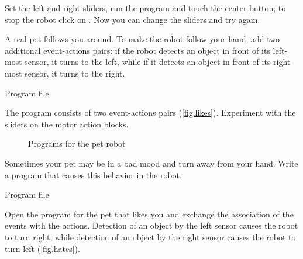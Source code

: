 Set the left and right sliders, run the program and touch the center
button; to stop the robot click on . Now you can change the
sliders and try again.



A real pet follows you around. To make the robot follow your hand, add
two additional event-actions pairs: if the robot detects an object in
front of its left-most sensor, it turns to the left, while if it detects
an object in front of its right-most sensor, it turns to the right.
                                                       
{\raggedleft \hfill Program file }

The program consists of two event-actions pairs (\cref{fig.likes}).
Experiment with the sliders on the motor action blocks.

\begin{figure}
	\hfill
	\caption{Programs for the pet robot}\label{fig.likes-hates}
\end{figure}




Sometimes your pet may be in a bad mood and turn away from your hand.
Write a program that causes this behavior in the robot.

{\raggedleft \hfill Program file }

Open the program for the pet that likes you and exchange the association
of the events with the actions. Detection of an object by the left
sensor causes the robot to turn right, while detection of an object by
the right sensor causes the robot to turn left (\cref{fig.hates}).


